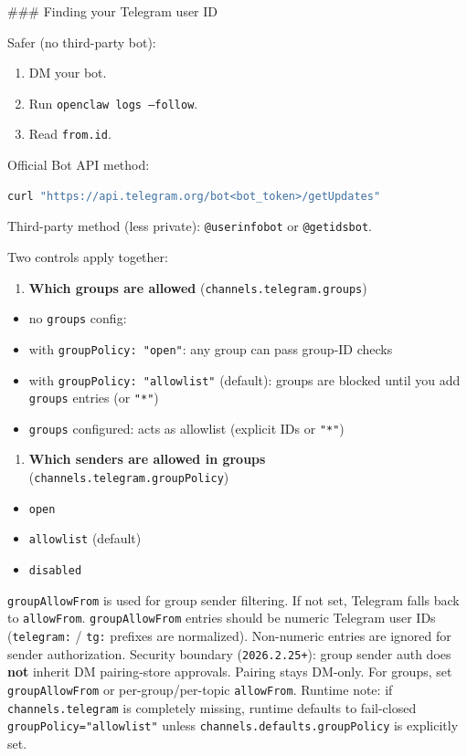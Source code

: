 \#\#\# Finding your Telegram user ID

Safer (no third-party bot):

\begin{enumerate}
  \item DM your bot.
  \item Run \texttt{openclaw logs --follow}.
  \item Read \texttt{from.id}.
\end{enumerate}


Official Bot API method:

\begin{lstlisting}[language=bash]
curl "https://api.telegram.org/bot<bot_token>/getUpdates"
\end{lstlisting}


Third-party method (less private): \texttt{@userinfobot} or \texttt{@getidsbot}.


Two controls apply together:

\begin{enumerate}
  \item \textbf{Which groups are allowed} (\texttt{channels.telegram.groups})
\end{enumerate}

\begin{itemize}
  \item no \texttt{groups} config:
  \item with \texttt{groupPolicy: "open"}: any group can pass group-ID checks
  \item with \texttt{groupPolicy: "allowlist"} (default): groups are blocked until you add \texttt{groups} entries (or \texttt{"*"})
  \item \texttt{groups} configured: acts as allowlist (explicit IDs or \texttt{"*"})
\end{itemize}


\begin{enumerate}
  \item \textbf{Which senders are allowed in groups} (\texttt{channels.telegram.groupPolicy})
\end{enumerate}

\begin{itemize}
  \item \texttt{open}
  \item \texttt{allowlist} (default)
  \item \texttt{disabled}
\end{itemize}


\texttt{groupAllowFrom} is used for group sender filtering. If not set, Telegram falls back to \texttt{allowFrom}.
\texttt{groupAllowFrom} entries should be numeric Telegram user IDs (\texttt{telegram:} / \texttt{tg:} prefixes are normalized).
Non-numeric entries are ignored for sender authorization.
Security boundary (\texttt{2026.2.25+}): group sender auth does \textbf{not} inherit DM pairing-store approvals.
Pairing stays DM-only. For groups, set \texttt{groupAllowFrom} or per-group/per-topic \texttt{allowFrom}.
Runtime note: if \texttt{channels.telegram} is completely missing, runtime defaults to fail-closed \texttt{groupPolicy="allowlist"} unless \texttt{channels.defaults.groupPolicy} is explicitly set.

